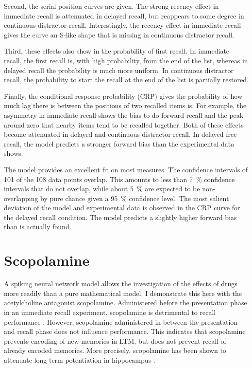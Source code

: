 Second, the serial position curves are given.
The strong recency effect in immediate recall is attenuated in delayed recall, but reappears to some degree in continuous distractor recall.
Interestingly, the recency effect in immediate recall gives the curve an S-like shape that is missing in continuous distractor recall.

Third, these effects also show in the probability of first recall.
In immediate recall, the first recall is, with high probability, from the end of the list, whereas in delayed recall the probability is much more uniform.
In continuous distractor recall, the probability to start the recall at the end of the list is partially restored.

Finally, the conditional response probability (CRP) gives the probability of how much lag there is between the positions of two recalled items is.
For example, the asymmetry in immediate recall shows the bias to do forward recall and the peak around zero that nearby items tend to be recalled together.
Both of these effects become attenuated in delayed and continuous distractor recall.
In delayed free recall, the model predicts a stronger forward bias than the experimental data shows.

The model provides an excellent fit on most measures.
The confidence intervals of \num{101} of the \num{108} data points overlap.
This amounts to less than \SI{7}{\percent} confidence intervals that do not overlap, while about \SI{5}{\percent} are expected to be non-overlapping by pure chance given a \SI{95}{\percent} confidence level.
The most salient deviation of the model and experimental data is observed in the CRP curve for the delayed recall condition.
The model predicts a slightly higher forward bias than is actually found.


\section{Scopolamine}
A spiking neural network model allows the investigation of the effects of drugs more readily than a pure mathematical model.
I demonstrate this here with the acetylcholine antagonist scopolamine.
Administered before the presentation phase in an immediate recall experiment, scopolamine is detrimental to recall performance \parencite{ghoneim1975}.
However, scopolamine administered in between the presentation and recall phase does not influence performance.
This indicates that scopolamine prevents encoding of new memories in LTM, but does not prevent recall of already encoded memories.
More precisely, scopolamine has been shown to attenuate long-term potentiation in hippocampus \parencite{leung2003,ito1988,hirotsu1989-1}.

